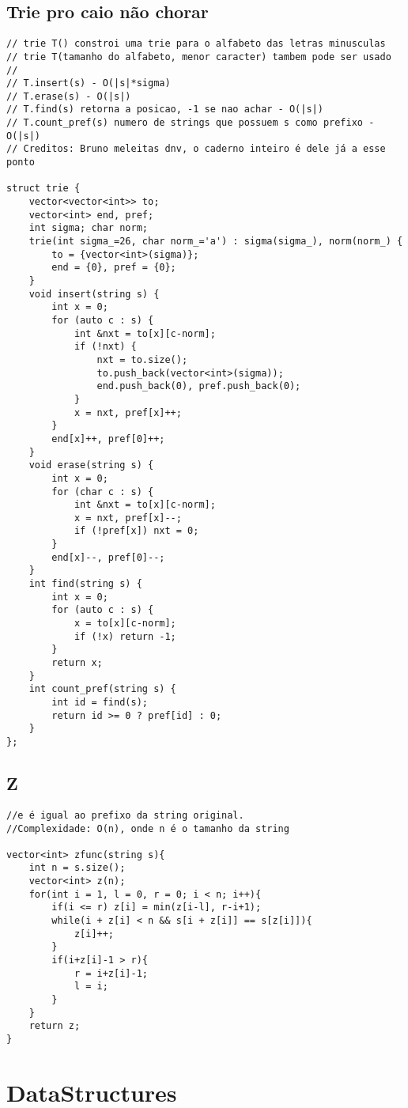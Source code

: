 \documentclass[11pt, a4paper, twoside]{article}
\begin{document}
\subsection{Trie pro caio não chorar}
\begin{verbatim}
// trie T() constroi uma trie para o alfabeto das letras minusculas
// trie T(tamanho do alfabeto, menor caracter) tambem pode ser usado
// 
// T.insert(s) - O(|s|*sigma)
// T.erase(s) - O(|s|)
// T.find(s) retorna a posicao, -1 se nao achar - O(|s|)
// T.count_pref(s) numero de strings que possuem s como prefixo - O(|s|)
// Creditos: Bruno meleitas dnv, o caderno inteiro é dele já a esse ponto

struct trie {
	vector<vector<int>> to;
	vector<int> end, pref;
	int sigma; char norm;
	trie(int sigma_=26, char norm_='a') : sigma(sigma_), norm(norm_) {
		to = {vector<int>(sigma)};
		end = {0}, pref = {0};
	}
	void insert(string s) {
		int x = 0;
		for (auto c : s) {
			int &nxt = to[x][c-norm];
			if (!nxt) {
				nxt = to.size();
				to.push_back(vector<int>(sigma));
				end.push_back(0), pref.push_back(0);
			}
			x = nxt, pref[x]++;
		}
		end[x]++, pref[0]++;
	}
	void erase(string s) {
		int x = 0;
		for (char c : s) {
			int &nxt = to[x][c-norm];
			x = nxt, pref[x]--;
			if (!pref[x]) nxt = 0;
		}
		end[x]--, pref[0]--;
	}
	int find(string s) {
		int x = 0;
		for (auto c : s) {
			x = to[x][c-norm];
			if (!x) return -1;
		}
		return x;
	}
	int count_pref(string s) {
		int id = find(s);
		return id >= 0 ? pref[id] : 0;
	}
};
\end{verbatim}

\subsection{Z}
\begin{verbatim}
//e é igual ao prefixo da string original.
//Complexidade: O(n), onde n é o tamanho da string

vector<int> zfunc(string s){
    int n = s.size();
    vector<int> z(n);
    for(int i = 1, l = 0, r = 0; i < n; i++){
        if(i <= r) z[i] = min(z[i-l], r-i+1);
        while(i + z[i] < n && s[i + z[i]] == s[z[i]]){
            z[i]++;
        }
        if(i+z[i]-1 > r){
            r = i+z[i]-1;
            l = i;
        }
    }
    return z;
}
\end{verbatim}



%
%

\section{DataStructures}
\end{document}
